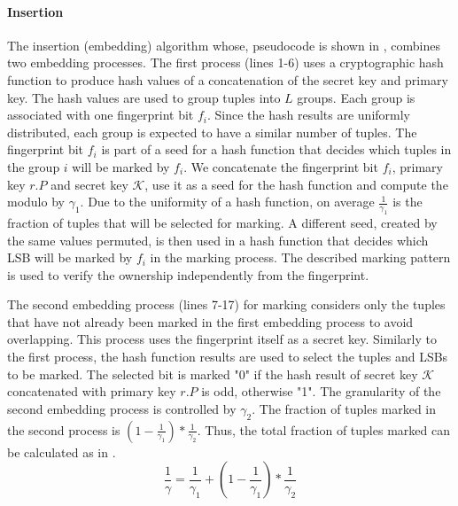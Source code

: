 \paragraph{Insertion} The insertion (embedding) algorithm whose, pseudocode is shown in , combines two embedding processes. 
The first process (lines 1-6) uses a cryptographic hash function to produce hash values of a concatenation of the secret key and primary key. The hash values are used to group tuples into $L$ groups. 
Each group is associated with one fingerprint bit $f_i$. 
Since the hash results are uniformly distributed, each group is expected to have a similar number of tuples. 
The fingerprint bit $f_i$ is part of a seed for a hash function that decides which tuples in the group $i$ will be marked by $f_i$. 
We concatenate the fingerprint bit $f_i$, primary key $r.P$ and secret key $\mathcal{K}$, use it as a seed for the hash function and compute the modulo by $\gamma_1$. 
Due to the uniformity of a hash function, on average $\frac{1}{\gamma_1}$ is the fraction of tuples that will be selected for marking. 
A different seed, created by the same values permuted, is then used in a hash function that decides which LSB will be marked by $f_i$ in the marking process. 
The described marking pattern is used to verify the ownership independently from the fingerprint. 

The second embedding process (lines 7-17) for marking considers only the tuples that have not already been marked in the first embedding process to avoid overlapping. 
This process uses the fingerprint itself as a secret key. 
Similarly to the first process, the hash function results are used to select the tuples and LSBs to be marked. 
The selected bit is marked "0" if the hash result of secret key $\mathcal{K}$ concatenated with primary key $r.P$ is odd, otherwise "1". 
The granularity of the second embedding process is controlled by $\gamma_2$.
The fraction of tuples marked in the second process is $(1-\frac{1}{\gamma_1})*\frac{1}{\gamma_2}$.
Thus, the total fraction of tuples marked can be calculated as in .
\begin{equation}\label{eq:total-gamma}
    \frac{1}{\gamma}=\frac{1}{\gamma_1}+(1-\frac{1}{\gamma_1})*\frac{1}{\gamma_2}
\end{equation}

